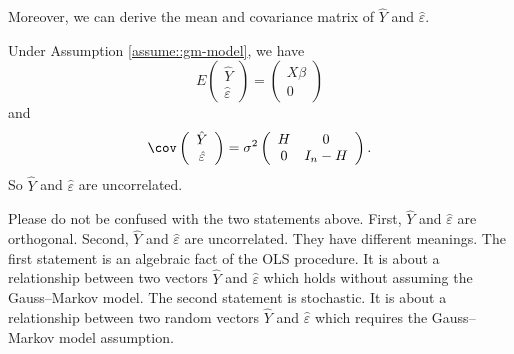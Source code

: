 Moreover, we can derive the mean and covariance matrix of $\hat{Y}$
and $\hat{\varepsilon}$.
\begin{theorem}
\label{thm:GMcov}Under Assumption \ref{assume::gm-model}, we have 
\[
E\left(\begin{array}{c}
\hat{Y}\\
\hat{\varepsilon}
\end{array}\right)=\left(\begin{array}{c}
X\beta\\
0
\end{array}\right)
\]
and 
\[
\cov\left(\begin{array}{c}
\hat{Y}\\
\hat{\varepsilon}
\end{array}\right)=\sigma^{2}\left(\begin{array}{cc}
H & 0 \\
0 & I_{n}-H
\end{array}\right).
\]
So $\hat{Y}$ and $\hat{\varepsilon}$
are uncorrelated. 
\end{theorem}


Please do not be confused with the two statements above. First, $\hat{Y}$ and $\hat{\varepsilon}$ are orthogonal. Second, $\hat{Y}$ and $\hat{\varepsilon}$
are uncorrelated. They have different meanings. The first statement is an algebraic fact of the OLS procedure. It is about a relationship between two vectors $\hat{Y}$ and $\hat{\varepsilon}$ which holds without assuming the Gauss--Markov model. The second statement is stochastic. It is about a relationship between two random vectors $\hat{Y}$ and $\hat{\varepsilon}$ which requires the Gauss--Markov model assumption. 


